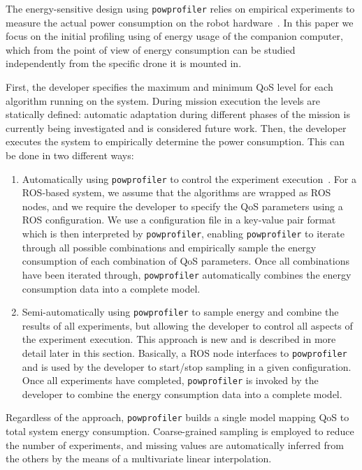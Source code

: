\documentclass[conference, onecolumn, draftclsnofoot]{IEEEtran}
\newcommand{\stt}[1]{{\small\tt #1}} %
\newcommand{\powprof}{\stt{powprofiler}}
\begin{document}
The energy-sensitive design using \powprof{} relies on empirical
experiments to measure the actual power consumption on the robot
hardware~\cite{seewald2019coarse}. In this paper we focus on the
initial profiling using of energy usage of the companion computer,
which from the point of view of energy consumption
can be studied independently from the specific drone it is mounted in.


First, the developer specifies the maximum and minimum QoS level for
each algorithm running on the system.  During mission execution the
levels are statically defined: automatic adaptation during different
phases of the mission is currently being investigated and is
considered future work.
%
Then, the developer executes the system to empirically determine the
power consumption. This can be done in two different ways:
%
\begin{enumerate}
\item Automatically using \powprof{} to control the experiment
  execution~\cite{seewald2019coarse}. For a ROS-based system, we assume that the algorithms
  are wrapped as ROS nodes, and we require the developer to specify
  the QoS parameters using a ROS configuration. We use a configuration
  file in a key-value pair format which is then interpreted by
  \powprof{}, enabling \powprof{} to iterate through all possible
  combinations and empirically sample the energy consumption of each
  combination of QoS parameters. Once all combinations have been
  iterated through, \powprof{} automatically combines the energy
  consumption data into a complete model.
\item Semi-automatically using \powprof{} to sample energy and combine
  the results of all experiments, but allowing the developer to
  control all aspects of the experiment execution. This approach is
  new and is described in more detail later in this
  section. Basically, a ROS node interfaces to \powprof{} and is used
  by the developer to start/stop sampling in a given
  configuration. Once all experiments have completed, \powprof{} is
  invoked by the developer to combine the energy consumption data into
  a complete model.


\end{enumerate}
%
Regardless of the approach, \powprof{} builds a single model mapping
QoS to total system energy consumption. Coarse-grained sampling is
employed to reduce the number of experiments, and missing values are
automatically inferred from the others by the means of a multivariate
linear interpolation.
\end{document}
